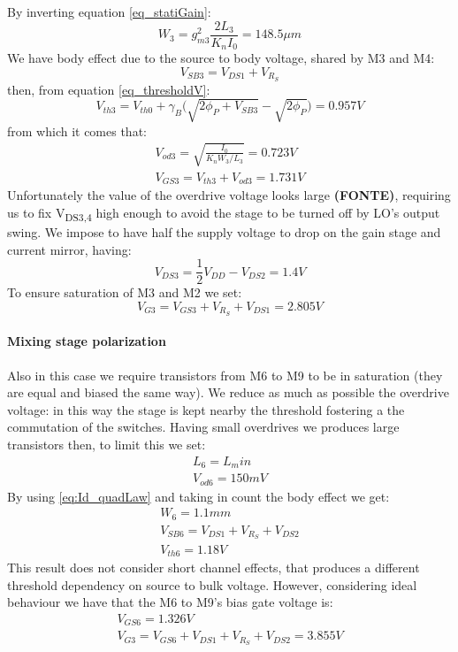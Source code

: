 By inverting equation \ref{eq_statiGain}:
\begin{equation}
W_3 = g_{m3}^2\frac{2L_{3}}{K_nI_0} = 148.5 \mu m
\end{equation}
We have body effect due to the source to body voltage, shared by M3 and M4:
\begin{equation}
	V_{SB3} = V_{DS1}+V_{R_S}
\end{equation} 
then, from equation \ref{eq_thresholdV}:
\begin{equation}
	V_{th3} = V_{th0}+\gamma_B\big(\sqrt{2\phi_P + V_{SB3}}-\sqrt{2\phi_P}\big) = 0.957 V 
\end{equation}
from which it comes that:
\begin{gather}
	V_{od3}=\sqrt{\frac{I_0}{K_n W_3/L_3}} = 0.723 V \\
	V_{GS3} = V_{th3}+V_{od3} = 1.731 V
\end{gather}
Unfortunately the value of the overdrive voltage looks large \textbf{(FONTE)}, requiring us to fix V\textsubscript{DS3,4} high enough to avoid the stage to be turned off by LO's output swing. We impose to have half the supply voltage to drop on the gain stage and current mirror, having:
\begin{equation}
	V_{DS3} = \frac{1}{2}V_{DD}-V_{DS2} = 1.4 V
\end{equation}
To ensure saturation of M3 and M2 we set:
\begin{equation}
	V_{G3}=V_{GS3} +V_{R_{S}}+V_{DS1} = 2.805 V 
\end{equation}

\paragraph{Mixing stage polarization}

Also in this case we require transistors from M6 to M9 to be in saturation (they are equal and biased the same way). We reduce as much as possible the overdrive voltage: in this way the stage is kept nearby the threshold fostering a the commutation of the switches. Having small overdrives we produces large transistors then, to limit this we set:
\begin{gather}
	L_6 = L_min  \\
	V_{od6} = 150mV 
\end{gather}
By using \ref{eq:Id_quadLaw} and taking in count the body effect we get:
\begin{gather}
W_6 = 1.1mm \\
V_{SB6} = V_{DS1}+V_{R_S}+V_{DS2}\\
V_{th6} = 1.18V
\end{gather}
This result does not consider short channel effects, that produces a different threshold dependency on source to bulk voltage. However, considering ideal behaviour we have that the M6 to M9's bias gate voltage is:
\begin{gather}
	V_{GS6}=1.326V \\
	V_{G3} = V_{GS6}+V_{DS1}+V_{R_S}+V_{DS2} = 3.855V
\end{gather}







